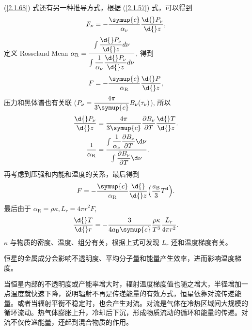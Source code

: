 \documentclass[../天体物理基础.tex]{subfiles}
\begin{document}
(\ref{2.1.68}) 式还有另一种推导方式，根据 (\ref{2.1.57}) 式，可以得到
\begin{equation}
F_{\nu}=-\frac{\symup{c}}{\alpha_{\nu}}\frac{\d{}P_{\nu}}{\d{}z},
\end{equation}
定义 Rosseland Mean $\alpha_{\mathrm{R}}=\dfrac{\int\dfrac{\d{}P_{\nu}}{\d{}z}d\nu}{\int\dfrac{1}{\alpha_{\nu}}\dfrac{\d{}P_{\nu}}{\d{}z}d\nu}$, 得到
\begin{equation}
F=-\frac{\symup{c}}{\alpha_{\mathrm{R}}}\frac{\d{}P}{\d{}z},
\end{equation}
压力和黑体谱也有关联 ($P_{\nu}=\dfrac{4\pi}{3\symup{c}}B_{\nu}\mleft(\tau_{\nu}\mright)$), 所以
\begin{align}
\frac{\d{}P_{\nu}}{\d{}z}&=\frac{4\pi}{3\symup{c}}\frac{\partial{}B_{\nu}}{\partial{}T}\frac{\d{}T}{\d{}z}.\\
\frac{1}{\alpha_{\mathrm{R}}}&=\frac{\int\dfrac{1}{\alpha_{\nu}}\dfrac{\partial{}B_{\nu}}{\partial{}T}\d\nu}{\int\dfrac{\partial{}B_{\nu}}{\partial{}T}\d\nu}.
\end{align}
再考虑到压强和内能和温度的关系，最后得到
\begin{equation}
F=-\frac{\symup{c}}{\alpha_{\mathrm{R}}}\frac{\d{}}{\d{}z}\mleft(\frac{a_{\mathrm{B}}}{3}T^{4}\mright).
\end{equation}
最后由于 $\alpha_{\mathrm{R}}=\rho\kappa, L_{r}=4\pi{}r^{2}F$,
\begin{equation}
\frac{\d{}T}{\d{}r}=-\frac{3}{4a_{\mathrm{B}}\symup{c}}\frac{\rho\kappa}{T^{3}}\frac{L_{r}}{4\pi{}r^{2}}.
\end{equation}
$\kappa$ 与物质的密度、温度、组分有关，根据上式可发现 $L_{r}$ 还和温度梯度有关。

恒星的金属成分会影响不透明度、平均分子量和能量产生效率，进而影响温度梯度。

当恒星内部的不透明度或产能率增大时，辐射温度梯度值也随之增大，半径增加一点温度就快速下降，说明辐射不再是传递能量的有效方式，恒星依靠对流传递能量。或者当辐射平衡不稳定时，也会产生对流。对流是气体在冷热区域间大规模的循环流动。热气体膨胀上升，冷却后下沉，形成物质流动的循环和能量的传递。对流不仅传递能量，还起到混合物质的作用。
\end{document}
